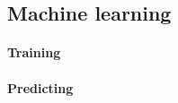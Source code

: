 \subsection{Machine learning\label{ml}}
\paragraph{Training\label{training}}
\paragraph{Predicting\label{predicting}}